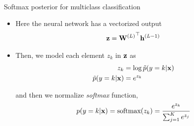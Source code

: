 \documentclass{beamer}
\begin{document}
    

\begin{frame}{Softmax posterior for multiclass classification}
\begin{itemize}
    \item 
Here the neural network has a vectorized output 
\begin{equation}
{\bf z}={{\bf W}^{(L)}}^{\top}{\bf h}^{(L-1)}
\end{equation}

    
\item Then, we model each element $z_k$ in $\bf z$ as 
\begin{equation}
\begin{split}
z_k&=\log \tilde{p}(y=k|{\bf x})\\
\tilde{p}(y=k|{\bf x})&=e^{z_k}
\end{split}
\end{equation}

and then we normalize  \emph{softmax} function, 
\begin{equation}\label{eq:softmax}
p(y=k|{\bf x})=\text{softmax}(z_k)=\frac{e^{z_k}}{\sum_{j=1}^K e^{z_j}}
\end{equation}
\end{itemize}
\end{frame}
\end{document}
